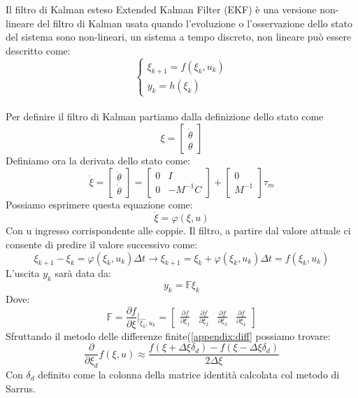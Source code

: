 Il filtro di Kalman esteso Extended Kalman Filter (EKF) è una versione non-lineare del filtro di Kalman usata quando l'evoluzione o l'osservazione dello stato del sistema sono non-lineari, un sistema a tempo discreto, non lineare può essere descritto come:
\begin{equation}
	\begin{cases}
		\xi_{k+1} = f(\xi_k,u_k)\\
		y_k = h(\xi_k)
	\end{cases}
\end{equation}
\\Per definire il filtro di Kalman partiamo dalla definizione dello stato come
\begin{equation}
\xi = \begin{bmatrix}
\dot{\theta} \\ \theta
\end{bmatrix}
\end{equation}
Definiamo ora la derivata dello stato come:
\begin{equation}
\dot{\xi} = \begin{bmatrix}
\ddot{\theta} \\ \dot{\theta}
\end{bmatrix} =\begin{bmatrix}
0 & I \\ 0 & -M^{-1}C
\end{bmatrix} + \begin{bmatrix}
0 \\ M^{-1}
\end{bmatrix}\tau_m
\end{equation}
Possiamo esprimere questa equazione come:
\begin{equation*}
\dot{\xi} = \varphi(\xi,u)
\end{equation*}
Con u ingresso corrispondente alle coppie. Il filtro, a partire dal valore attuale ci consente di predire il valore successivo come:
\begin{equation}
\xi_{k+1} - \xi_{k} = \varphi(\xi_k,u_k)\Delta t \rightarrow \xi_{k+1} = \xi_k + \varphi(\xi_k,u_k)\Delta t = f(\xi_k,u_k)
\end{equation}
L'uscita $y_k$ sarà data da: 
\begin{equation}
y_k = \mathbb{F}\xi_k
\end{equation}
Dove:
\begin{equation*}
\mathbb{F} = \frac{\partial f}{\partial \xi} \Bigg|_{\hat{\xi_k},u_k} = \begin{bmatrix}
\frac{\partial f}{\partial \xi_1} & \frac{\partial f}{\partial \xi_2} & \frac{\partial f}{\partial \xi_3} & \frac{\partial f}{\partial \xi_4}
\end{bmatrix}
\end{equation*}
Sfruttando il metodo delle differenze finite(\ref{appendix:diff} possiamo trovare:
\begin{equation}
\frac{\partial}{\partial \xi_d} f(\xi,u) \approx \frac{f(\xi+\Delta\xi\delta_d)-f(\xi-\Delta\xi\delta_d)}{2\Delta\xi}
\end{equation}
Con $\delta_d$ definito come la colonna della matrice identità calcolata col metodo di Sarrus.